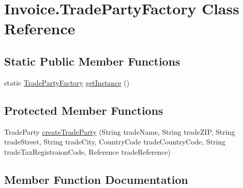 \hypertarget{class_invoice_1_1_trade_party_factory}{}\section{Invoice.\+Trade\+Party\+Factory Class Reference}
\label{class_invoice_1_1_trade_party_factory}
\subsection*{Static Public Member Functions}
\begin{DoxyCompactItemize}
\item 
static \hyperlink{class_invoice_1_1_trade_party_factory}{Trade\+Party\+Factory} \hyperlink{class_invoice_1_1_trade_party_factory_abe2fa3405b1673df89b667b6dacfc23e}{get\+Instance} ()
\end{DoxyCompactItemize}
\subsection*{Protected Member Functions}
\begin{DoxyCompactItemize}
\item 
Trade\+Party \hyperlink{class_invoice_1_1_trade_party_factory_adf542c6cd1fbb6cb8e5045ce76fe5dd0}{create\+Trade\+Party} (String trade\+Name, String trade\+Z\+IP, String trade\+Street, String trade\+City, Country\+Code trade\+Country\+Code, String trade\+Tax\+Registraion\+Code, Reference trade\+Reference)
\end{DoxyCompactItemize}


\subsection{Member Function Documentation}
